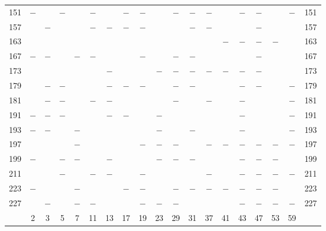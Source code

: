 \begin{center}
\begin{tabular}{r|c|c|c|c|c|c|c|c|c|c|c|c|c|c|c|c|c|r}
151 & $-$ &  & $-$ &  & $-$ &  & $-$ & $-$ &  & $-$ & $-$ & $-$ &  & $-$ & $-$ &  & $-$ & 151\\
157 &  & $-$ &  &  & $-$ & $-$ & $-$ & $-$ &  &  & $-$ & $-$ &  &  & $-$ &  &  & 157\\
163 &  &  &  &  &  &  &  &  &  &  &  &  & $-$ & $-$ & $-$ & $-$ &  & 163\\
167 & $-$ & $-$ &  & $-$ & $-$ &  &  & $-$ &  & $-$ & $-$ &  &  &  & $-$ &  &  & 167\\
173 &  &  &  &  &  & $-$ &  &  & $-$ & $-$ & $-$ & $-$ & $-$ & $-$ & $-$ &  &  & 173\\
179 &  & $-$ & $-$ &  &  & $-$ & $-$ & $-$ &  & $-$ & $-$ &  &  & $-$ & $-$ &  & $-$ & 179\\
181 &  & $-$ & $-$ &  & $-$ & $-$ &  &  &  & $-$ &  & $-$ &  & $-$ &  &  & $-$ & 181\\
191 & $-$ & $-$ & $-$ &  &  & $-$ & $-$ &  & $-$ &  &  &  &  & $-$ &  &  & $-$ & 191\\
193 & $-$ & $-$ &  & $-$ &  &  &  &  & $-$ &  & $-$ &  &  & $-$ &  &  & $-$ & 193\\
197 &  &  &  & $-$ &  &  &  & $-$ & $-$ & $-$ &  & $-$ & $-$ & $-$ & $-$ & $-$ & $-$ & 197\\
199 & $-$ &  & $-$ & $-$ &  & $-$ &  &  & $-$ & $-$ & $-$ &  &  & $-$ & $-$ & $-$ &  & 199\\
211 &  &  & $-$ &  & $-$ & $-$ &  & $-$ &  &  &  & $-$ &  & $-$ & $-$ & $-$ & $-$ & 211\\
223 & $-$ &  &  & $-$ &  &  & $-$ & $-$ &  & $-$ & $-$ & $-$ & $-$ & $-$ & $-$ & $-$ &  & 223\\
227 &  & $-$ &  & $-$ & $-$ &  &  & $-$ & $-$ & $-$ &  &  &  & $-$ & $-$ & $-$ & $-$ & 227\\
\hline
 & 2 & 3 & 5 & 7 & 11 & 13 & 17 & 19 & 23 & 29 & 31 & 37 & 41 & 43 & 47 & 53 & 59 & \\
\hline
\end{tabular}\endgroup\end{center}
\clearpage
